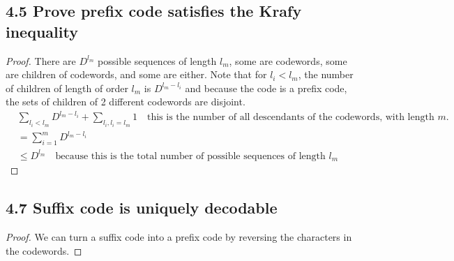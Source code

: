 \documentclass[../main.tex]{subfiles}
\begin{document}
 \subsection*{4.5 Prove prefix code satisfies the Krafy inequality}
 \begin{proof}
     There are $D^{l_m}$ possible sequences of length $l_m$, some are codewords, some are children of codewords, and some are either. Note that for $l_i < l_m$, the number of children of length of order $l_m$ is $D^{l_m-l_i}$ and because the code is a prefix code, the sets of children of 2 different codewords are disjoint. \begin{align*}
         &\sum_{l_i<l_{m}}D^{l_m-l_i} + \sum_{l_i, l_i=l_m}1\quad\text{this is the number of all descendants of the codewords, with length $m$.}\\
         &=\sum_{i=1}^{m}D^{l_m-l_i}\\
         &\leq D^{l_m}\quad \text{because this is the total number of possible sequences of length $l_m$}
     \end{align*}
 \end{proof}
 \subsection*{4.7 Suffix code is uniquely decodable}
 \begin{proof}
     We can turn a suffix code into a prefix code by reversing the characters in the codewords.
 \end{proof}
\end{document}
